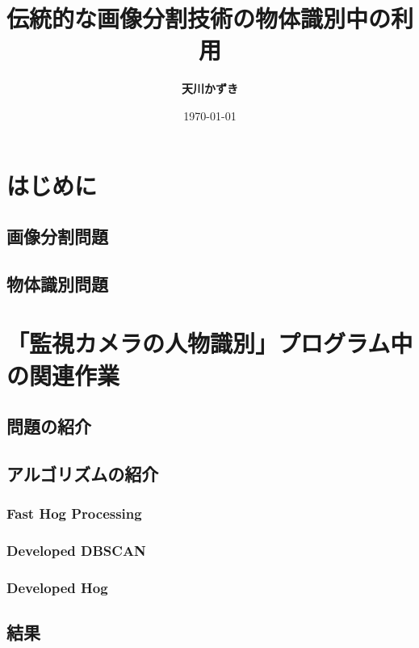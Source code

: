 \documentclass[UTF8]{ctexart}
\title{伝統的な画像分割技術の物体識別中の利用}
\author{\textbf{天川かずき}}
\date{\today}
\theoremstyle{plain}
\begin{document}
\maketitle

\setcounter{page}{1}
\section{はじめに}
\subsection{画像分割問題}

\subsection{物体識別問題}




\section{「監視カメラの人物識別」プログラム中の関連作業}
\subsection{問題の紹介}


\subsection{アルゴリズムの紹介}
\subsubsection{Fast Hog Processing}


\subsubsection{Developed DBSCAN}


\subsubsection{Developed Hog}


\subsection{結果}
\end{document}
